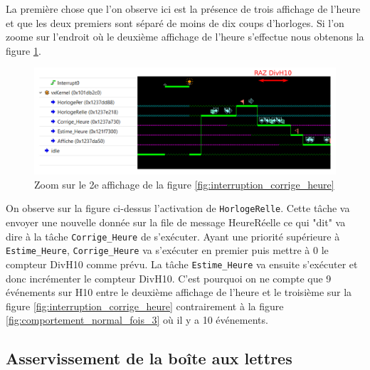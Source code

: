 \documentclass[french]{article}
\begin{document}
	La première chose que l'on observe ici est la présence de trois affichage de l'heure et que les deux premiers sont séparé de moins de dix coups d'horloges. Si l'on zoome sur l'endroit où le deuxième affichage de l'heure s'effectue nous obtenons la figure \ref{fig:interruption_corrige_heure_zoom}.

	\begin{figure}[H]
		\centering
		\includegraphics[width=16cm]{photo/affichage_normal/semB}
		\caption{Zoom sur le 2e affichage de la figure \ref{fig:interruption_corrige_heure}}
		\label{fig:interruption_corrige_heure_zoom}
	\end{figure}

	On observe sur la figure ci-dessus l'activation de \texttt{HorlogeRelle}. Cette tâche va envoyer une nouvelle donnée sur la file de message HeureRéelle ce qui "dit" va dire à la tâche \texttt{Corrige\_Heure} de s'exécuter. Ayant une priorité supérieure à \texttt{Estime\_Heure}, \texttt{Corrige\_Heure} va s'exécuter en premier puis mettre à 0 le compteur DivH10 comme prévu. La tâche \texttt{Estime\_Heure} va ensuite s'exécuter et donc incrémenter le compteur DivH10. C'est pourquoi on ne compte que 9 événements sur H10 entre le deuxième affichage de l'heure et le troisième sur la figure \ref{fig:interruption_corrige_heure} contrairement à la figure \ref{fig:comportement_normal_fois_3} où il y a 10 événements.


	\subsection{Asservissement de la boîte aux lettres}	
	
\end{document}
